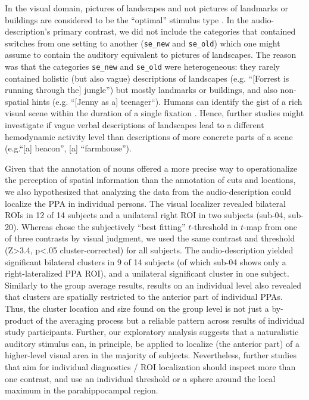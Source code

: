 \documentclass[english]{article}
\begin{document}

In the visual domain, pictures of landscapes and not pictures of landmarks or
buildings are considered to be the ``optimal'' stimulus type
\citep{epstein2008parahippocampal}.
In the audio-description's primary contrast, we did not include the categories that contained
switches from one setting to another (\texttt{se\_new} and \texttt{se\_old})
which one might assume to contain the auditory equivalent to pictures of
landscapes.
The reason was that the categories \texttt{se\_new} and \texttt{se\_old} were
heterogeneous: they rarely contained holistic (but also vague) descriptions of
landscapes (e.g.  ``[Forrest is running through the] jungle'') but mostly
landmarks or buildings, and also non-spatial hints (e.g. ``[Jenny as a]
teenager``).
Humans can identify the gist of a rich visual scene within the duration of a
single fixation \citep{henderson2003human}.
%
Hence, further studies might investigate if vague verbal descriptions of
landscapes lead to a different hemodynamic activity level than descriptions of
more concrete parts of a scene (e.g.``[a] beacon'', [a] ``farmhouse'').


Given that the annotation of nouns offered a more precise way to operationalize
the perception of spatial information than the annotation of cuts and locations,
we also hypothesized that analyzing the data from the audio-description could
localize the PPA in individual persons.
The visual localizer \citep{sengupta2016extension} revealed bilateral ROIs in 12
of 14 subjects and a unilateral right ROI in two subjects (sub-04, sub-20).
%
Whereas \citep{sengupta2016extension} chose the subjectively ``best fitting''
$t$-threshold in $t$-map from one of three contrasts by visual judgment, we used
the same contrast and threshold (Z>3.4, p<.05 cluster-corrected) for all
subjects.
The audio-description yielded significant bilateral clusters in 9 of 14 subjects
(of which sub-04 shows only a right-lateralized PPA ROI), and a unilateral
significant cluster in one subject.
Similarly to the group average results, results on an individual level also
revealed that clusters are spatially restricted to the anterior part of
individual PPAs.
Thus, the cluster location and size found on the group level is not just a
by-product of the averaging process but a reliable pattern across results of
individual study participants.
Further, our exploratory analysis suggests that a naturalistic auditory stimulus
can, in principle, be applied to localize (the anterior part) of a higher-level
visual area in the majority of subjects.
Nevertheless, further studies that aim for individual diagnostics / ROI
localization should inspect more than one contrast, and use an individual
threshold or a sphere around the local maximum \citep{poldrack2007region} in the
parahippocampal region.
\end{document}
